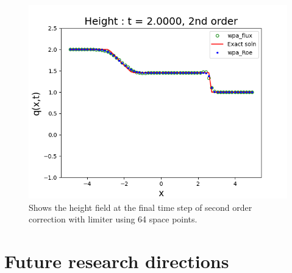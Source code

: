 \documentclass[12pt,a4paper]{article}
\begin{document}
{	\begin{figure}[H]
		\centering
		\includegraphics[width=0.6\linewidth]{images/2lim}
		\caption{Shows the height field at the final time step of second order correction with limiter using 64 space points.}
		\label{fig:2lim}
	\end{figure}
} %


	\section{ Future research directions}
	
	
	
	
	
	
	
	
\end{document}
